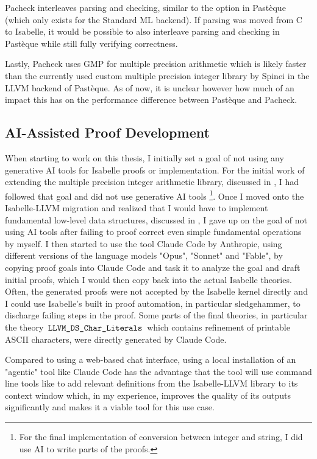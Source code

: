 Pacheck interleaves parsing and checking, similar to the  option in Pastèque (which only exists for the Standard ML backend).
If parsing was moved from C to Isabelle, it would be possible to also interleave parsing and checking in Pastèque while still fully verifying correctness.

Lastly, Pacheck uses GMP \cite{gmp} for multiple precision arithmetic which is likely faster than the currently used custom multiple precision integer library by Spinei \cite{spinei_isabelle_big_integer} in the LLVM backend of Pastèque.
As of now, it is unclear however how much of an impact this has on the performance difference between Pastèque and Pacheck.

\subsection{AI-Assisted Proof Development}\label{sec:ai-usage-discussion}
When starting to work on this thesis, I initially set a goal of not using any generative AI tools for Isabelle proofs or implementation.
For the initial work of extending the multiple precision integer arithmetic library, discussed in , I had followed that goal and did not use generative AI tools \footnote{For the final implementation of conversion between integer and string, I did use AI to write parts of the proofs.}.
Once I moved onto the Isabelle-LLVM migration and realized that I would have to implement fundamental low-level data structures, discussed in , I gave up on the goal of not using AI tools after failing to proof correct even simple fundamental operations by myself.
I then started to use the tool Claude Code by Anthropic, using different versions of the language models "Opus", "Sonnet" and "Fable", by copying proof goals into Claude Code and task it to analyze the goal and draft initial proofs, which I would then copy back into the actual Isabelle theories.
Often, the generated proofs were not accepted by the Isabelle kernel directly and I could use Isabelle's built in proof automation, in particular sledgehammer, to discharge failing steps in the proof.
Some parts of the final theories, in particular the theory $\,\text{\ttfamily LLVM\_DS\_Char\_Literals}\,$ which contains refinement of printable ASCII characters, were directly generated by Claude Code.

Compared to using a web-based chat interface, using a local installation of an "agentic" tool like Claude Code has the advantage that the tool will use command line tools like  to add relevant definitions from the Isabelle-LLVM library to its context window which, in my experience, improves the quality of its outputs significantly and makes it a viable tool for this use case.

